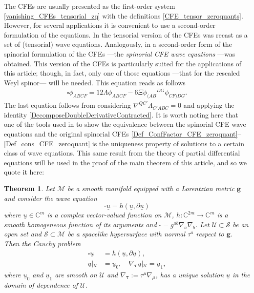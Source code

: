 \documentclass[10pt,a4paper]{article}
\theoremstyle{plain}
\newtheorem{theorem}{Theorem}
\def\bmg{{\bm g}}
\newcounter{mnotecount}%
\newcommand{\mnotex}[1]%
{\protect{\stepcounter{mnotecount}}$^{\mbox{\footnotesize $\bullet$\themnotecount}}$ 
\marginpar{%
\raggedright\tiny\em
$\!\!\!\!\!\!\,\bullet$\themnotecount: #1} }
\begin{document}
The CFEs are usually presented as the first-order system
\eqref{vanishing_CFEs_tensorial_zq} with the definitions
\eqref{CFE_tensor_zeroquants}. However, for several applications it is
convenient to use a second-order formulation of the equations. In
\cite{Pae13} the tensorial version of the CFEs was recast as a set of
(tensorial) wave equations.  Analogously, in \cite{GasVal15} a
second-order form of the spinorial formulation of the CFEs ---the
\emph{spinorial CFE wave equations} ---was obtained.  This version of
the CFEs is particularly suited for the applications of this article;
though, in fact, only one of those equations ---that for the rescaled
Weyl spinor--- will be needed.
This equation reads as follows
\begin{eqnarray}
  \square \phi _{ABCF} = 12 \Lambda \phi _{ABCF} -6 \Xi \phi
  _{(AB}{}^{DG}\phi _{CF)DG}.
  \label{Wave_eq_CFE_Weyl}
\end{eqnarray}
The last equation follows from considering $\nabla^{QC'}\Lambda
_{C'ABC}=0$ and applying the identity
\eqref{DecomposeDoubleDerivativeContracted}.
It is worth noting here that one of the tools used in \cite{GasVal15}
to show the equivalence between the spinorial CFE wave equations and
the original spinorial CFEs
\eqref{Def_ConfFactor_CFE_zeroquant}--\eqref{Def_cons_CFE_zeroquant}
is the uniqueness property of solutions to a certain class of wave
equations. This same result from the theory of partial differential
equations will be used in the proof of the main theorem of this
article, and so we quote it here:
\begin{theorem}
\label{TheoremHomogeneousWave}
 Let $\mathcal{M}$ be a smooth manifold equipped with a Lorentzian
 metric $\bmg$ and consider the wave equation
\[\square \underline{u}=h (\underline{u},\partial\underline{u})\]
where $\underline{u}\in\mathbb{C}^m$ is a complex vector-valued
function on $\mathcal{M}$, $h:\mathbb{C}^{2m}\rightarrow\mathbb{C}^m$
is a smooth homogeneous function of its arguments and
$\square=g^{ab}\nabla_{a}\nabla_{b}$.  Let
$\mathcal{U}\subset\mathcal{S}$ be an open set and $\mathcal{S}\subset
\mathcal{M}$ be a spacelike hypersurface with normal $\tau^{a}$
respect to $\bmg$. Then the Cauchy problem
\begin{align*}
\square \underline{u}&=h (\underline{u},
\partial\underline{u}),\\ \underline{u}\left|_{\mathcal{U}}\right.&=\underline{u}_0,
\quad
\nabla_{\bm\tau}\underline{u}\left|_{\mathcal{U}}\right.=\underline{u}_1,
\end{align*} 
where $\underline{u}_{0}$ and $\underline{u}_{1}$ are smooth on
$\mathcal{U}$ and $\nabla_{\bm\tau}:= \tau^\mu\nabla_\mu$, has a
unique solution $\underline{u}$ in the domain of dependence of
$\mathcal{U}$.
\end{theorem}
\end{document}

